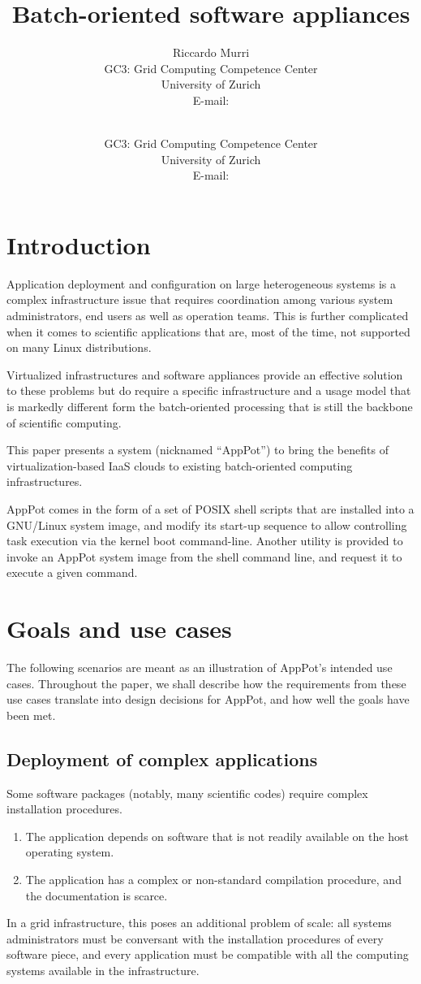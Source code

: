 \documentclass{PoS}
\title{Batch-oriented software appliances}
\author{Riccardo Murri\\
        GC3: Grid Computing Competence Center\\
        University of Zurich \\
        E-mail: \email{riccardo.murri@gmail.com}}
\author{\speaker{Sergio MAFFIOLETTI}\\
        GC3: Grid Computing Competence Center\\
        University of Zurich \\
         E-mail: \email{sergio.maffioletti@gc3.uzh.ch}}
\begin{document}
\section{Introduction}
Application deployment and configuration on large heterogeneous
systems is a complex infrastructure issue that requires
coordination among various system administrators, end users as well as
operation teams. This is further complicated when it comes to
scientific applications that are, most of the time, not supported on
many Linux distributions.


Virtualized infrastructures and software appliances provide an
effective solution to these problems but do require a specific
infrastructure and a usage model that is markedly different form the
batch-oriented processing that is still the backbone of scientific
computing.

This paper presents a system (nicknamed ``AppPot'') to bring the
benefits of virtualization-based \acs{IaaS} clouds to existing
batch-oriented computing infrastructures. 

AppPot comes in the form of a set of \acs{POSIX} shell 
scripts that are installed into a GNU/Linux system image, and modify
its start-up sequence to allow controlling task execution via the
kernel boot command-line.  Another utility is provided to invoke an
AppPot system image from the shell command line, and request it to
execute a given command. 

\section{Goals and use cases}
\label{sec:usecases}

The following scenarios are meant as an illustration of AppPot's
intended use cases.  Throughout the paper, we shall describe how the
requirements from these use cases translate into design decisions for
AppPot, and how well the goals have been met.

\subsection{Deployment of complex applications}
\label{sec:usecase-deployment}

Some software packages (notably, many scientific codes) require
complex installation procedures. 
\begin{enumerate}
\item\label{R1} 
  The application depends on software that is not readily
  available on the host operating system.
\item\label{R2} 
  The application has a complex or non-standard compilation
  procedure, and the documentation is scarce.
\end{enumerate}
In a grid infrastructure, this poses an additional problem of scale:
all systems administrators must be conversant with the installation
procedures of every software piece, and every application must be
compatible with all the computing systems available in the
infrastructure. 
\end{document}

